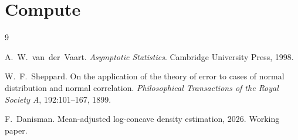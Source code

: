 \documentclass[11pt]{article}
\begin{document}
\section{Compute}
\label{app:theoryval}




\begin{thebibliography}{9}

A.~W.\ van~der~Vaart.
\newblock \emph{Asymptotic Statistics}.
\newblock Cambridge University Press, 1998.

W.~F.\ Sheppard.
\newblock On the application of the theory of error to cases of normal distribution and normal correlation.
\newblock \emph{Philosophical Transactions of the Royal Society A}, 192:101--167, 1899.

F.~Danisman.
\newblock Mean-adjusted log-concave density estimation, 2026. Working paper.



\end{thebibliography}

  

\end{document}
